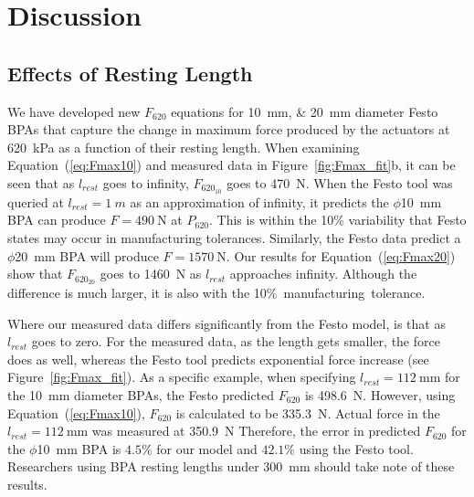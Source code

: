 \documentclass[actuators,article,accept,pdftex,moreauthors]{Definitions/mdpi}
\begin{document}
\section{Discussion}

\subsection{Effects of Resting Length}
We have developed new $F_{620}$ equations for \qtylist{10;20}{\mm} diameter Festo BPAs that capture the change in maximum force produced by the actuators at  \qty{620}{\kPa} as a function of their resting length. When examining Equation~(\ref{eq:Fmax10}) and measured data in Figure~\ref{fig:Fmax_fit}{b}, it can be seen that as $l_{rest}$ goes to infinity, $F_{620_{10}}$ goes to \qty{470}{\N}. When the Festo tool \citep{lang_robert_musclesim_2005} was queried at $l_{rest}=\qty{1}{m}$ as an approximation of infinity, it predicts the $\phi$\qty{10}{\mm} BPA can produce $F=\qty{490}{\N}$ at $P_{620}$. This is within the 10\% variability that Festo states may occur in manufacturing tolerances. Similarly, the Festo data predict a $\phi$\qty{20}{\mm} BPA will produce $F=\qty{1570}{\N}$. Our results for Equation~(\ref{eq:Fmax20}) show that  $F_{620_{20}}$ goes to \qty{1460}{\N} as $l_{rest}$ approaches infinity. Although the difference is much larger, it is also with the \mbox{10\% manufacturing tolerance. }

Where our measured data differs significantly from the Festo model, is that as $l_{rest}$ goes to zero. For the measured data, as the length gets smaller, the force does as well, whereas the Festo tool predicts exponential force increase (see Figure~\ref{fig:Fmax_fit}). As a specific example, when specifying $l_{rest}=\qty{112}{\mm}$ for the \qtylist{10}{\mm} diameter BPAs, the Festo predicted $F_{620}$ is \qtylist{498.6}{\N}. However, using Equation~(\ref{eq:Fmax10}), $F_{620}$ is calculated to be \qtylist{335.3}{\N}. Actual force in the $l_{rest}=\qty{112}{\mm}$ was measured at \qtylist{350.9}{\N} Therefore, the error in predicted $F_{620}$ for the $\phi$\qty{10}{\mm} BPA is $4.5\%$ for our model and $42.1\%$ using the Festo tool. Researchers using BPA resting lengths under \qty{300}{\mm} should take note of these results.
\end{document}
